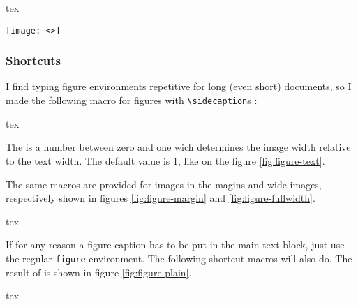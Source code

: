 \documentclass[
	raggedright,
	twoside,
	12pt,
	colorful,
]{tufte-style-article}
\begin{document}
\begin{codebox}{tex}
\begin{figure*}
	\texttt{[image: <>]} %
\end{figure*}
\end{codebox}




\subsubsection{Shortcuts}

I find typing figure environments repetitive for long (even short) documents, so I made the following macro for figures with \texttt{\textbackslash sidecaption}s :

\begin{codebox}{tex}
\end{codebox}

The  is a number between zero and one wich determines the image width relative to the text width. The default value is 1, like on the figure \ref{fig:figure-text}.

The same macros are provided for images in the magins and wide images, respectively shown in figures \ref{fig:figure-margin} and \ref{fig:figure-fullwidth}.

\begin{codebox}{tex}
\end{codebox}



If for any reason a figure caption has to be put in the main text block, just use the regular \texttt{figure} environment. The following shortcut macros will also do. The result of  is shown in figure \ref{fig:figure-plain}.

\begin{codebox}{tex}
\end{codebox}
\end{document}
